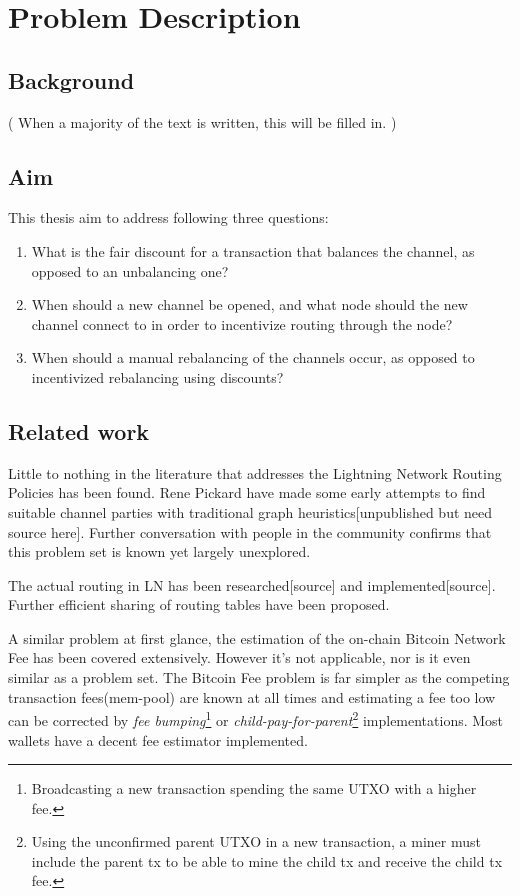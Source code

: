 \chapter{Problem Description}

\section{Background}
    \label{sec:background}

	( When a majority of the text is written, this will be filled in. )

\section{Aim}
    \label{sec:aim}

This thesis aim to address following three questions:

    \begin{enumerate}
	\item What is the fair discount for a transaction that balances the channel, as
		opposed to an unbalancing one?
	\item When should a new channel be opened, and what node should the new
		channel connect to in order to incentivize routing through the node?
	\item When should a manual rebalancing of the channels occur, as opposed to
		incentivized rebalancing using discounts?
    \end{enumerate}

\section{Related work}
    \label{sec:related_work}

	Little to nothing in the literature that addresses the Lightning Network Routing Policies has been found. Rene Pickard have made some early attempts to find suitable channel parties with traditional graph heuristics[unpublished but need source here]. Further conversation with people in the community confirms that this problem set is known yet largely unexplored.
	
	The actual routing in LN has been researched[source] and implemented[source]. Further efficient sharing of routing tables have been proposed.
	
	A similar problem at first glance, the estimation of the on-chain Bitcoin Network Fee has been covered extensively. However it's not applicable, nor is it even similar as a problem set. The Bitcoin Fee problem is far simpler as the competing transaction fees(mem-pool) are known at all times and estimating a fee too low can be corrected by \textit{fee bumping}\footnote{Broadcasting a new transaction spending the same UTXO with a higher fee.} or \textit{child-pay-for-parent}\footnote{Using the unconfirmed parent UTXO in a new transaction, a miner must include the parent tx to be able to mine the child tx and receive the child tx fee.} implementations. Most wallets have a decent fee estimator implemented.
	
